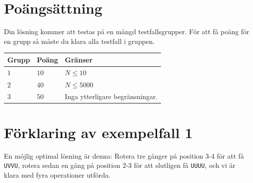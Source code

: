 \section*{Poängsättning}
Din lösning kommer att testas på en mängd testfallsgrupper.
För att få poäng för en grupp så måste du klara alla testfall i gruppen.

\noindent
\begin{tabular}{| l | l | l |}
  \hline
  \textbf{Grupp} & \textbf{Poäng} & \textbf{Gränser} \\ \hline
  $1$   & $10$       & $N \leq 10$ \\ \hline
  $2$   & $40$       & $N \leq 5000$ \\ \hline
  $3$   & $50$       & Inga ytterligare begränsningar. \\ \hline
\end{tabular}

\section*{Förklaring av exempelfall 1}
En möjlig optimal lösning är denna: Rotera tre gånger på position 3-4 för att få \texttt{UVVU}, rotera sedan
en gång på position 2-3 för att slutligen få \texttt{UUUU}, och vi är klara med fyra operationer utförda.

